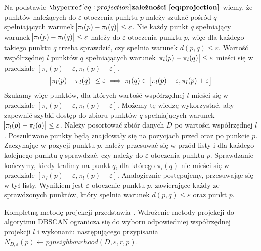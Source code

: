 Na podstawie $ \myhyperref{eq:projection}{zależności} $ wiemy, że punktów należących do $ \varepsilon $-otoczenia punktu $ p $ należy szukać pośród $ q $ spełniających warunek \mbox{$ \abs{\pi_l(p) - \pi_l(q)} \le \varepsilon $}. Nie każdy punkt $ q $ spełniający warunek $ \abs{\pi_l(p) - \pi_l(q)} \le \varepsilon $ należy do \linebreak$ \varepsilon $-otoczenia punktu $ p $, więc dla każdego takiego punktu $ q $ trzeba sprawdzić, czy spełnia warunek $ d(p,q) \le \varepsilon $. Wartość współrzędnej $ l $ punktów $ q $ spełniających warunek $ \abs{\pi_l(p) - \pi_l(q)} \le \varepsilon $ mieści się w przedziale $ \left[\pi_l(p)-\varepsilon,\pi_l(p)+\varepsilon\right] $.
\begin{equation}
	\abs{\pi_l(p) - \pi_l(q)} \le \varepsilon \implies \pi_l(q) \in \left[\pi_l(p)-\varepsilon,\pi_l(p)+\varepsilon\right]
\end{equation}
Szukamy więc punktów, dla których wartość współrzędnej $ l $ mieści się w przedziale $ \left[\pi_l(p)-\varepsilon,\pi_l(p)+\varepsilon\right] $. Możemy tę wiedzę wykorzystać, aby zapewnić szybki dostęp do zbioru punktów $ q $ spełniających warunek $ \abs{\pi_l(p) - \pi_l(q)} \le \varepsilon $. Należy posortować zbiór danych $ D $ po wartości współrzędnej $ l $. Poszukiwane punkty będą znajdowały się na pozycjach przed oraz po punkcie $ p $. Zaczynając w pozycji punktu $ p $, należy przesuwać się w przód listy i dla każdego kolejnego punktu $ q $ sprawdzać, czy należy do $ \varepsilon $-otoczenia punktu $ p $. Sprawdzanie kończymy, kiedy trafimy na punkt $ q $, dla którego $ \pi_l(q) $ nie mieści się w przedziale $ \left[\pi_l(p)-\varepsilon,\pi_l(p)+\varepsilon\right] $. Analogicznie postępujemy, przesuwając się w tył listy. Wynikiem jest $ \varepsilon $-otoczenie punktu $ p $, zawierające każdy ze sprawdzonych punktów, który spełnia warunek $ d(p,q) \le \varepsilon $ oraz punkt $ p $.

Kompletną metodę projekcji przedstawia . Wdrożenie metody projekcji do algorytmu DBSCAN ogranicza się do wyboru odpowiedniej współrzędnej projekcji $ l $ i wykonaniu następującego przypisania \linebreak\mbox{$ N_{D,\varepsilon}(p) \gets pjneighbourhood(D, \varepsilon, r, p) $.}

